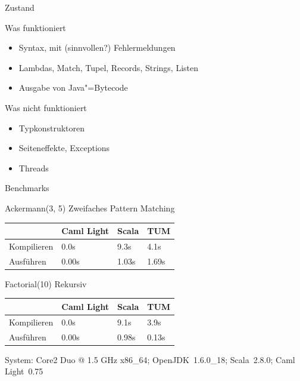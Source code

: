 \documentclass[hyperref={pdfpagelabels=false}]{beamer}
\begin{document}
\begin{frame}{Zustand}
  \begin{exampleblock}{Was funktioniert}
    \begin{itemize}
      \item Syntax, mit (sinnvollen?) Fehlermeldungen
      \item Lambdas, Match, Tupel, Records, Strings, Listen
      \item Ausgabe von Java"=Bytecode
    \end{itemize}
  \end{exampleblock}
  \begin{alertblock}{Was nicht funktioniert}
    \begin{itemize}
      \item Typkonstruktoren
      \item Seiteneffekte, Exceptions
      \item Threads
    \end{itemize}
  \end{alertblock}
\end{frame}

\begin{frame}{Benchmarks}
  \begin{block}{Ackermann(3, 5)}
    Zweifaches Pattern Matching

    \begin{tabular}{l|l|l|l}
       & Caml Light & Scala & TUM \\
      \hline
      Kompilieren & \textcolor{fastest}{0.0s} & \textcolor{slowest}{9.3s} & 4.1s \\
      Ausführen & \textcolor{fastest}{0.00s} & 1.03s & \textcolor{slowest}{1.69s} \\
    \end{tabular}
  \end{block}
  \begin{block}{Factorial(10)}
    Rekursiv

    \begin{tabular}{l|l|l|l}
       & Caml Light & Scala & TUM \\
      \hline
      Kompilieren & \textcolor{fastest}{0.0s} & \textcolor{slowest}{9.1s} & 3.9s \\
      Ausführen & \textcolor{fastest}{0.00s} & \textcolor{slowest}{0.98s} & 0.13s \\
    \end{tabular}
  \end{block}
  System: Core2 Duo @ 1.5 GHz x86\_64; OpenJDK~1.6.0\_18; Scala~2.8.0; Caml Light~0.75
\end{frame}
\end{document}
